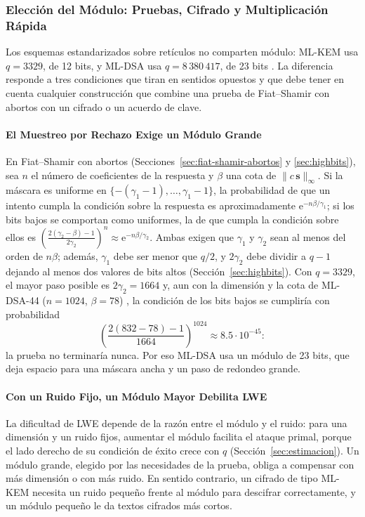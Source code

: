 \subsubsection{Elección del Módulo: Pruebas, Cifrado y Multiplicación Rápida}
\label{sec:eleccion-modulo}

Los esquemas estandarizados sobre retículos no comparten módulo: ML-KEM usa $q = 3329$, de 12 bits, y ML-DSA usa $q = 8\,380\,417$, de 23 bits \cite{nist2024fips203, nist2024fips204}. La diferencia responde a tres condiciones que tiran en sentidos opuestos y que debe tener en cuenta cualquier construcción que combine una prueba de Fiat--Shamir con abortos con un cifrado o un acuerdo de clave.

\paragraph{El Muestreo por Rechazo Exige un Módulo Grande}
En Fiat--Shamir con abortos (Secciones~\ref{sec:fiat-shamir-abortos} y \ref{sec:highbits}), sea $n$ el número de coeficientes de la respuesta y $\beta$ una cota de $\|c\,\mathbf{s}\|_\infty$. Si la máscara es uniforme en $\{-(\gamma_1-1), \dots, \gamma_1-1\}$, la probabilidad de que un intento cumpla la condición sobre la respuesta es aproximadamente $\mathrm{e}^{-n\beta/\gamma_1}$; si los bits bajos se comportan como uniformes, la de que cumpla la condición sobre ellos es $\left(\frac{2(\gamma_2-\beta)-1}{2\gamma_2}\right)^{n} \approx \mathrm{e}^{-n\beta/\gamma_2}$. Ambas exigen que $\gamma_1$ y $\gamma_2$ sean al menos del orden de $n\beta$; además, $\gamma_1$ debe ser menor que $q/2$, y $2\gamma_2$ debe dividir a $q-1$ dejando al menos dos valores de bits altos (Sección~\ref{sec:highbits}). Con $q = 3329$, el mayor paso posible es $2\gamma_2 = 1664$ y, aun con la dimensión y la cota de ML-DSA-44 ($n = 1024$, $\beta = 78$) \cite{nist2024fips204}, la condición de los bits bajos se cumpliría con probabilidad
\begin{equation}
\left(\frac{2(832-78)-1}{1664}\right)^{1024} \approx 8.5 \cdot 10^{-45}:
\end{equation}
la prueba no terminaría nunca. Por eso ML-DSA usa un módulo de 23 bits, que deja espacio para una máscara ancha y un paso de redondeo grande.

\paragraph{Con un Ruido Fijo, un Módulo Mayor Debilita LWE}
La dificultad de LWE depende de la razón entre el módulo y el ruido: para una dimensión y un ruido fijos, aumentar el módulo facilita el ataque primal, porque el lado derecho de su condición de éxito crece con $q$ (Sección~\ref{sec:estimacion}). Un módulo grande, elegido por las necesidades de la prueba, obliga a compensar con más dimensión o con más ruido. En sentido contrario, un cifrado de tipo ML-KEM necesita un ruido pequeño frente al módulo para descifrar correctamente, y un módulo pequeño le da textos cifrados más cortos.

